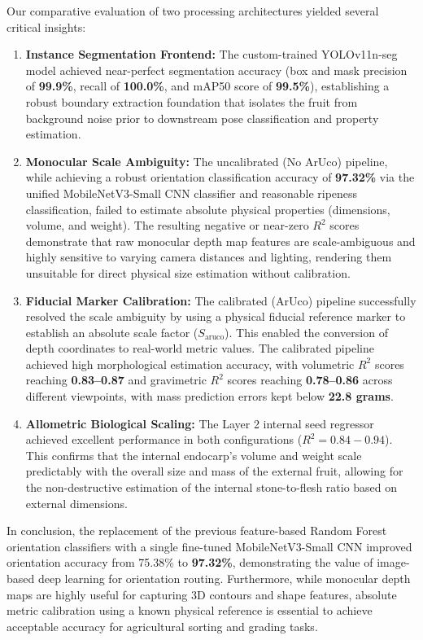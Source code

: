 Our comparative evaluation of two processing architectures yielded several critical insights:
\begin{enumerate}
    \item \textbf{Instance Segmentation Frontend:} The custom-trained YOLOv11n-seg model
    achieved near-perfect segmentation accuracy (box and mask precision of \textbf{99.9\%},
    recall of \textbf{100.0\%}, and mAP50 score of \textbf{99.5\%}), establishing a robust boundary
    extraction foundation that isolates the fruit from background noise prior to downstream pose
    classification and property estimation.
    \item \textbf{Monocular Scale Ambiguity:} The uncalibrated (No ArUco) pipeline, while
    achieving a robust orientation classification accuracy of \textbf{97.32\%} via the unified
    MobileNetV3-Small CNN classifier and reasonable ripeness classification, failed to
    estimate absolute physical properties (dimensions, volume, and weight). The resulting negative
    or near-zero $R^2$ scores demonstrate that raw monocular depth map features are scale-ambiguous
    and highly sensitive to varying camera distances and lighting, rendering them unsuitable for
    direct physical size estimation without calibration.
    \item \textbf{Fiducial Marker Calibration:} The calibrated (ArUco) pipeline successfully
    resolved the scale ambiguity by using a physical fiducial reference marker to establish an absolute
    scale factor ($S_{\text{aruco}}$). This enabled the conversion of depth coordinates to real-world
    metric values. The calibrated pipeline achieved high morphological estimation accuracy, with
    volumetric $R^2$ scores reaching \textbf{0.83--0.87} and gravimetric $R^2$ scores reaching
    \textbf{0.78--0.86} across different viewpoints, with mass prediction errors kept below
    \textbf{22.8 grams}.
    \item \textbf{Allometric Biological Scaling:} The Layer 2 internal seed regressor achieved
    excellent performance in both configurations ($R^2 = 0.84 - 0.94$). This confirms that the internal
    endocarp's volume and weight scale predictably with the overall size and mass of the external
    fruit, allowing for the non-destructive estimation of the internal stone-to-flesh ratio based on
    external dimensions.
\end{enumerate}

In conclusion, the replacement of the previous feature-based Random Forest orientation
classifiers with a single fine-tuned MobileNetV3-Small CNN improved orientation accuracy
from 75.38\% to \textbf{97.32\%}, demonstrating the value of image-based deep learning
for orientation routing. Furthermore, while monocular depth maps are highly useful for
capturing 3D contours and shape features, absolute metric calibration using a known
physical reference is essential to achieve acceptable accuracy for agricultural sorting and
grading tasks.

